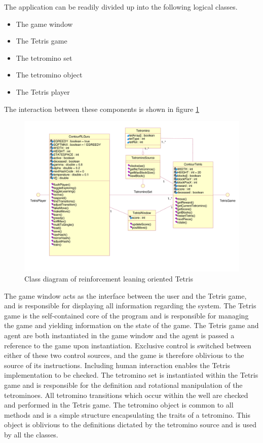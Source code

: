 \documentclass{rucsthesis}
\begin{document}
The application can be readily divided up into the following logical classes.

\begin{itemize}
\item{The game window}
\item{The Tetris game}
\item{The tetromino set}
\item{The tetromino object}
\item{The Tetris player}
\end{itemize}

The interaction between these components is shown in figure \ref{fig:uml}

\begin{figure}[h]
\centering
\includegraphics[width=6in]{finaluml.png}
\caption{Class diagram of reinforcement leaning oriented Tetris}
\label{fig:uml}
\end{figure}

The game window acts as the interface between the user and the Tetris game, and is responsible for displaying all information regarding the system. The Tetris game is the self-contained core of the program and is responsible for managing the game and yielding information on the state of the game. The Tetris game and agent are both instantiated in the game window and the agent is passed a reference to the game upon instantiation. Exclusive control is switched between either of these two control sources, and the game is therefore oblivious to the source of its instructions.  Including human interaction enables the Tetris implementation to be checked. The tetromino set is instantiated within the Tetris game and is responsible for the definition and rotational manipulation of the tetrominoes. All tetromino transitions which occur within the well are checked and performed in the Tetris game. The tetromino object is common to all methods and is a simple structure encapsulating the traits of a tetromino. This object is oblivious to the definitions dictated by the tetromino source and is used by all the classes.
\end{document}
